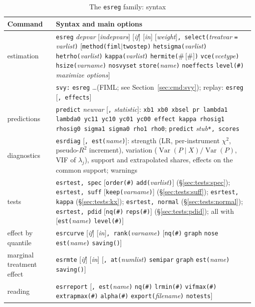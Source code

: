 \documentclass[11pt,a4paper]{article}
\theoremstyle{plain}
\theoremstyle{definition}
\theoremstyle{remark}
\newcommand{\Var}{\operatorname{Var}}
\newcommand{\1}{\mathbf{1}}
\newcommand{\cmd}[1]{\texttt{#1}}
\begin{document}
\begin{table}[!htb]
\centering
\caption{The \cmd{esreg} family: syntax}
\label{tab:syntax}
\scriptsize
\begin{tabular}{@{}L{4.2cm}L{11.2cm}@{}}
\toprule
Command & Syntax and main options \\
\midrule
estimation & \cmd{esreg} \textit{depvar} [\textit{indepvars}] [\textit{if}] [\textit{in}] [\textit{weight}]\cmd{, select(}\textit{treatvar} \cmd{=} \textit{varlist}\cmd{)} [\cmd{method(fiml}$\mid$\cmd{twostep)} \cmd{hetsigma(}\textit{varlist}\cmd{)} \cmd{hetrho(}\textit{varlist}\cmd{)} \cmd{kappa(}\textit{varlist}\cmd{)} \cmd{hermite(}\#\,[\#]\cmd{)} \cmd{vce(}\textit{vcetype}\cmd{)} \cmd{hsize(}\textit{varname}\cmd{)} \cmd{nosvyset} \cmd{store(}\textit{name}\cmd{)} \cmd{noeffects} \cmd{level(\#)} \textit{maximize options}] \\
 & \cmd{svy:} \cmd{esreg} \ldots (FIML; see Section~\ref{sec:cmd:svy}); replay: \cmd{esreg} [\cmd{, effects}] \\
predictions & \cmd{predict} \textit{newvar} [\cmd{,} \textit{statistic}]: \cmd{xb1 xb0 xbsel pr lambda1 lambda0 yc11 yc10 yc01 yc00 effect kappa rhosig1 rhosig0 sigma1 sigma0 rho1 rho0}; \cmd{predict} \textit{stub}\cmd{*, scores} \\
diagnostics & \cmd{esrdiag} [\cmd{, est(}\textit{name}\cmd{)}]: strength (LR, per-instrument $\chi^2$, pseudo-$R^2$ increment), variation ($\Var(P\mid X)/\Var(P)$, VIF of $\lambda_j$), support and extrapolated shares, effects on the common support; warnings \\
tests & \cmd{esrtest, spec} [\cmd{order(\#)} \cmd{add(}\textit{varlist}\cmd{)}] (\S\ref{sec:tests:spec}); \cmd{esrtest, suff} [\cmd{keep(}\textit{varname}\cmd{)}] (\S\ref{sec:tests:suff}); \cmd{esrtest, kappa} (\S\ref{sec:tests:kx}); \cmd{esrtest, normal} (\S\ref{sec:tests:normal}); \cmd{esrtest, pdid} [\cmd{nq(\#)} \cmd{reps(\#)}] (\S\ref{sec:tests:pdid}); all with [\cmd{est(}\textit{name}\cmd{)} \cmd{level(\#)}] \\
effect by quantile & \cmd{esrcurve} [\textit{if}] [\textit{in}]\cmd{, rank(}\textit{varname}\cmd{)} [\cmd{nq(\#)} \cmd{graph} \cmd{nose} \cmd{est(}\textit{name}\cmd{)} \cmd{saving()}] \\
marginal treatment effect & \cmd{esrmte} [\textit{if}] [\textit{in}] [\cmd{, at(}\textit{numlist}\cmd{)} \cmd{semipar} \cmd{graph} \cmd{est(}\textit{name}\cmd{)} \cmd{saving()}] \\
reading & \cmd{esrreport} [\cmd{, est(}\textit{name}\cmd{)} \cmd{nq(\#)} \cmd{lrmin(\#)} \cmd{vifmax(\#)} \cmd{extrapmax(\#)} \cmd{alpha(\#)} \cmd{export(}\textit{filename}\cmd{)} \cmd{notests}] \\

\end{tabular}
\end{table}
\end{document}
